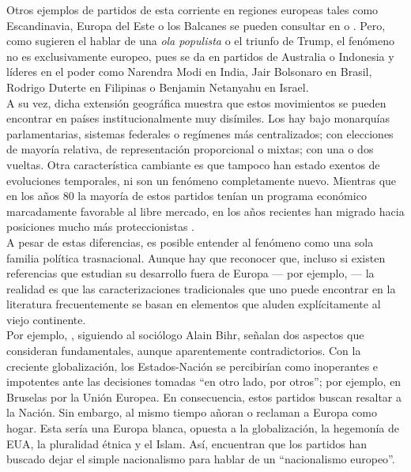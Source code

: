 Otros ejemplos de partidos de esta corriente en regiones europeas tales como Escandinavia, Europa del Este o los Balcanes se pueden consultar en \textcite{Mammone12} o \textcite{Hainsworth16a}. Pero, como sugieren el hablar de una \textit{ola populista} o el triunfo de Trump, el fenómeno no es exclusivamente europeo, pues se da en partidos de Australia o Indonesia y líderes en el poder como Narendra Modi en India, Jair Bolsonaro en Brasil, Rodrigo Duterte en Filipinas o Benjamin Netanyahu en Israel.\\ 

A su vez, dicha extensión geográfica muestra que estos movimientos se pueden encontrar en países institucionalmente muy disímiles. Los hay bajo monarquías parlamentarias, sistemas federales o regímenes más centralizados; con elecciones de mayoría relativa, de representación proporcional o mixtas; con una o dos vueltas. Otra característica cambiante es que tampoco han estado exentos de evoluciones temporales, ni son un fenómeno completamente nuevo. Mientras que en los años 80 la mayoría de estos partidos tenían un programa económico marcadamente favorable al libre mercado, en los años recientes han migrado hacia posiciones mucho más proteccionistas \parencite{Mudde16}.\\ 

A pesar de estas diferencias, es posible entender al fenómeno como una sola familia política trasnacional. Aunque hay que reconocer que, incluso si existen referencias que estudian su desarrollo fuera de Europa --- por ejemplo,  \textcite{CoxDurham16}--- la realidad es que las caracterizaciones tradicionales que uno puede encontrar en la literatura frecuentemente se basan en elementos que aluden explícitamente al viejo continente.\\ 

Por ejemplo, \textcite{Mammone12}, siguiendo al sociólogo Alain Bihr, señalan dos aspectos que consideran fundamentales, aunque aparentemente contradictorios. Con la creciente globalización, los Estados-Nación se percibirían como inoperantes e impotentes ante las decisiones tomadas “en otro lado, por otros”; por ejemplo, en Bruselas por la Unión Europea. En consecuencia, estos partidos buscan resaltar a la Nación. Sin embargo, al mismo tiempo añoran o reclaman a Europa como hogar. Esta sería una Europa blanca, opuesta a la globalización, la hegemonía de EUA, la pluralidad étnica y el Islam. Así, \citeauthor{Mammone12} encuentran que los partidos han buscado dejar el simple nacionalismo para hablar de un “nacionalismo europeo”.\\ 

